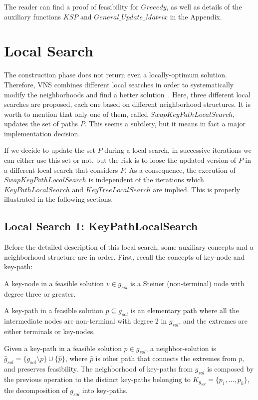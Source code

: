 The reader can find a proof of feasibility for $Greeedy$, as well as details of the auxiliary functions $KSP$ and $General\_Update\_Matrix$ in the Appendix.

\section{Local Search}
The construction phase does not return even a locally-optimum solution. Therefore, 
VNS combines different local searches in order to systematically modify the neighborhoods and 
find a better solution~\cite{5,18,88}. Here, three different 
local searches are proposed, each one based on different neighborhood structures. 
It is worth to mention that only one of them, called $SwapKeyPathLocalSearch$, updates the 
set of paths $P$. This seems a subtlety, but it means in fact a major implementation decision. 

If we decide to update the set $P$ during a local search, in successive iterations we can either use this set or not, but the risk is to loose the updated version of $P$ in a different local search that considers $P$. As a consequence, the execution of $SwapKeyPathLocalSearch$ is independent 
of the iterations which $KeyPathLocalSearch$ and $KeyTreeLocalSearch$ are implied. This is properly  illustrated in the following sections. 


\subsection{Local Search 1: KeyPathLocalSearch}
Before the detailed description of this local search, some auxiliary concepts and a neighborhood structure are in order. First, recall the concepts of key-node and key-path:

\begin{definition}
A key-node in a feasible solution $v \in g_{sol}$ is a Steiner (non-terminal) node with degree three or  greater.
\end{definition}

\begin{definition}
A key-path in a feasible solution $p \subseteq g_{sol}$ is an elementary path 
where all the intermediate nodes are non-terminal with degree 2 in $g_{sol}$, 
and the extremes are either terminals or key-nodes.
\end{definition}

\begin{definition}
Given a key-path in a feasible solution $p \in g_{sol}$, a neighbor-solution is 
${\hat{g}}_{sol} = \{g_{sol} \setminus p \} \cup \{\hat{p}\}$, 
where $\hat{p}$ is other path that connects the extremes from $p$, and preserves feasibility. 
The neighborhood of key-paths from $g_{sol}$ is composed by the previous operation 
to the distinct key-paths belonging to $K_{g_{sol}}=\{p_1,\ldots,p_h\}$, the decomposition of 
$g_{sol}$ into key-paths. 
\end{definition}

